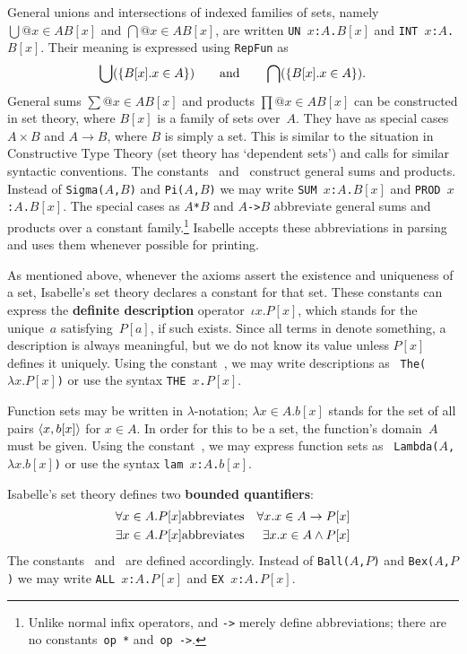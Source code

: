 General unions and intersections of indexed
families of sets, namely $\bigcup@{x\in A}B[x]$ and $\bigcap@{x\in A}B[x]$,
are written \hbox{\tt UN $x$:$A$.$B[x]$} and \hbox{\tt INT $x$:$A$.$B[x]$}.
Their meaning is expressed using {\tt RepFun} as
\[ \bigcup(\{B[x]. x\in A\}) \qquad\hbox{and}\qquad 
   \bigcap(\{B[x]. x\in A\}). 
\]
General sums $\sum@{x\in A}B[x]$ and products $\prod@{x\in A}B[x]$ can be
constructed in set theory, where $B[x]$ is a family of sets over~$A$.  They
have as special cases $A\times B$ and $A\to B$, where $B$ is simply a set.
This is similar to the situation in Constructive Type Theory (set theory
has `dependent sets') and calls for similar syntactic conventions.  The
constants~ and~ construct general sums and
products.  Instead of {\tt Sigma($A$,$B$)} and {\tt Pi($A$,$B$)} we may write
\hbox{\tt SUM $x$:$A$.$B[x]$} and \hbox{\tt PROD $x$:$A$.$B[x]$}.  
%
The special cases as \hbox{\tt$A$*$B$} and \hbox{\tt$A$->$B$} abbreviate
general sums and products over a constant family.\footnote{Unlike normal
infix operators, {\tt*} and {\tt->} merely define abbreviations; there are
no constants~{\tt op~*} and~\hbox{\tt op~->}.} Isabelle accepts these
abbreviations in parsing and uses them whenever possible for printing.

As mentioned above, whenever the axioms assert the existence and uniqueness
of a set, Isabelle's set theory declares a constant for that set.  These
constants can express the {\bf definite description} operator~$\iota
x.P[x]$, which stands for the unique~$a$ satisfying~$P[a]$, if such exists.
Since all terms in {\ZF} denote something, a description is always
meaningful, but we do not know its value unless $P[x]$ defines it uniquely.
Using the constant~, we may write descriptions as {\tt
  The($\lambda x.P[x]$)} or use the syntax \hbox{\tt THE $x$.$P[x]$}.

Function sets may be written in $\lambda$-notation; $\lambda x\in A.b[x]$
stands for the set of all pairs $\langle x,b[x]\rangle$ for $x\in A$.  In order for
this to be a set, the function's domain~$A$ must be given.  Using the
constant~, we may express function sets as {\tt
Lambda($A$,$\lambda x.b[x]$)} or use the syntax \hbox{\tt lam $x$:$A$.$b[x]$}.

Isabelle's set theory defines two {\bf bounded quantifiers}:
\begin{eqnarray*}
   \forall x\in A.P[x] &\hbox{abbreviates}& \forall x. x\in A\rightarrow P[x] \\
   \exists x\in A.P[x] &\hbox{abbreviates}& \exists x. x\in A\wedge P[x]
\end{eqnarray*}
The constants~ and~ are defined
accordingly.  Instead of {\tt Ball($A$,$P$)} and {\tt Bex($A$,$P$)} we may
write
\hbox{\tt ALL $x$:$A$.$P[x]$} and \hbox{\tt EX $x$:$A$.$P[x]$}.


